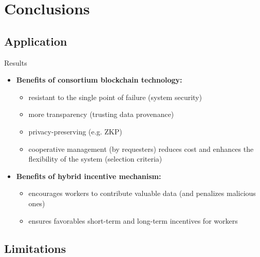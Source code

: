 

\section{Conclusions}

\subsection{Application}

\begin{frame}{Results}
  \begin{itemize}
  \item \textbf{Benefits of consortium blockchain technology:} 
  	\begin{itemize}
  		\item resistant to the single point of failure (system security)
  		\item more transparency (trusting data provenance)
  		\item privacy-preserving (e.g. ZKP)
  		\item cooperative management (by requesters) reduces cost and enhances the flexibility of the system (selection criteria)
  	\end{itemize}
  \item \textbf{Benefits of hybrid incentive mechanism:}
  	\begin{itemize}
  		\item encourages workers to contribute valuable data (and penalizes malicious ones)
  		\item ensures favorables short-term and long-term incentives for workers
  	\end{itemize}
  \end{itemize}
\end{frame}


\subsection{Limitations}

